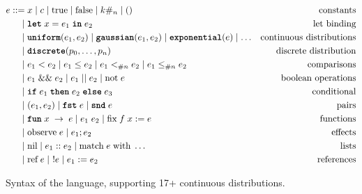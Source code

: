 \begin{figure}[!t]
\begin{align*}
e ::= &\; x \mid c \mid \text{true} \mid \text{false} \mid k\#_{n} \mid () & \text{constants} \\
    | &\; \text{\ttfamily\bfseries let} \; x = e_1\; \text{\ttfamily\bfseries in} \; e_2  & \text{let binding} \\
    | &\; \text{\ttfamily\bfseries uniform}(e_1, e_2) \mid \text{\ttfamily\bfseries gaussian}(e_1, e_2) \mid \text{\ttfamily\bfseries exponential}(e) \mid \ldots & \text{continuous distributions} \\
    | &\; \text{\ttfamily\bfseries discrete}(p_0, \ldots, p_{n})      & \text{discrete distribution} \\
    | &\; e_1 < e_2 \mid e_1 \leq e_2 \mid e_1 <_{\#{n}} e_2 \mid e_1 \leq_{\#{n}} e_2 & \text{comparisons} \\
    | &\; e_1 \mathrel{\&\&} e_2 \mid e_1 \mathrel{||} e_2 \mid \text{not}\; e & \text{boolean operations} \\
    | &\; \text{\ttfamily\bfseries if} \; e_1\; \text{\ttfamily\bfseries then} \; e_2\; \text{\ttfamily\bfseries else} \; e_3 & \text{conditional} \\
    | &\; (e_1, e_2) \mid \text{\ttfamily\bfseries fst} \; e \mid \text{\ttfamily\bfseries snd} \; e & \text{pairs} \\
    | &\; \text{\ttfamily\bfseries fun} \; x \; \rightarrow \; e \mid e_1 \; e_2 \mid \text{fix}\; f\; x := e & \text{functions} \\
    | &\; \text{observe}\; e \mid e_1; e_2 & \text{effects} \\
    | &\; \text{nil} \mid e_1 :: e_2 \mid \text{match}\; e\; \text{with}\; \ldots & \text{lists} \\
    | &\; \text{ref}\; e \mid\ !e \mid e_1 := e_2 & \text{references}
\end{align*}
\caption{Syntax of the \Slice{} language, supporting 17+ continuous distributions.}
\label{fig:grammar}
\end{figure}